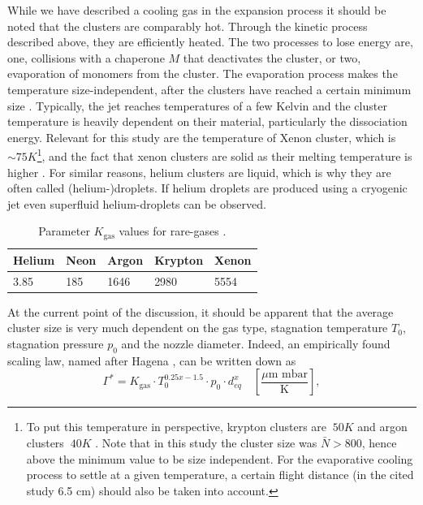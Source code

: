 While we have described a cooling gas in the expansion process it should be noted that the clusters are comparably hot. Through the kinetic process described above, they are efficiently heated. The two processes to lose energy are, one, collisions with a chaperone $M$ that deactivates the cluster, or two, evaporation of monomers from the cluster. The evaporation process makes the temperature size-independent, after the clusters have reached a certain minimum size \cite{Farges-1981-SurfSci}. Typically, the jet reaches temperatures of a few Kelvin and the cluster temperature is heavily dependent on their material, particularly the dissociation energy. Relevant for this study are the temperature of Xenon cluster, which is $\sim 75K$\footnote{To put this temperature in perspective, krypton clusters are $~50K$ and argon clusters $~40K$ \citep{Farges-1981-SurfSci,Gspann-1986-Springer}. Note that in this study the cluster size was $\bar{N} > 800$, hence above the minimum value to be size independent. For the evaporative cooling process to settle at a given temperature, a certain flight distance (in the cited study 6.5 cm) should also be taken into account.}, and the fact that xenon clusters are solid as their melting temperature is higher \cite{Gspann-1986-Springer}. For similar reasons, helium clusters are liquid, which is why they are often called (helium-)droplets. If helium droplets are produced using a cryogenic jet even superfluid helium-droplets can be observed.\\[1\baselineskip]
\begin{table}
	\centering
		\begin{tabular}{ | l | l | l | l | l | }
			\hline
			Helium & Neon & Argon & Krypton & Xenon \\ \hline
			3.85 & 185 & 1646 & 2980 & 5554 \\ \hline
		\end{tabular}
	\caption[Parameter $K_{\text{gas}}$ values for rare-gases.]{Parameter $K_{\text{gas}}$ values for rare-gases \cite{Schorb-2012-Thesis}.}
	\label{tab:k-parameter}
\end{table}
At the current point of the discussion, it should be apparent that the average cluster size is very much dependent on the gas type, stagnation temperature $T_{0}$, stagnation pressure $p_{0}$ and the nozzle diameter. Indeed, an empirically found scaling law, named after Hagena \cite{Hagena-1972-JCP,Hagena-1981-SurfSci,Hagena-1987-ZeitschriftAMC}, can be written down as
\begin{equation}
\Gamma^{*} = K_{\text{gas}} \cdot T_{0}^{0.25x-1.5} \cdot p_{0} \cdot d_{eq}^{x}\quad \left[\frac{\text{$\mu$m mbar}}{\text{K}}\right],
\label{eq:Hagena-parameter}
\end{equation}
